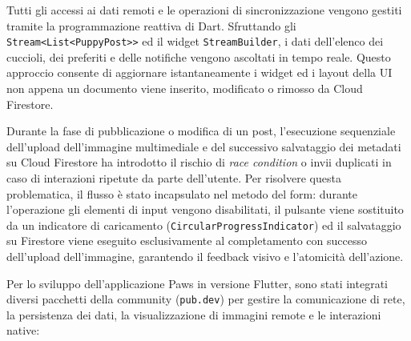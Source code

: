 \documentclass[a4paper]{report}
\begin{document}
Tutti gli accessi ai dati remoti e le operazioni di sincronizzazione vengono gestiti tramite la programmazione reattiva di Dart. Sfruttando gli \texttt{Stream<List<PuppyPost>>} ed il widget \texttt{StreamBuilder}, i dati dell’elenco dei cuccioli, dei preferiti e delle notifiche vengono ascoltati in tempo reale. Questo approccio consente di aggiornare istantaneamente i widget ed i layout della UI non appena un documento viene inserito, modificato o rimosso da Cloud Firestore.


Durante la fase di pubblicazione o modifica di un post, l'esecuzione sequenziale dell'upload dell'immagine multimediale e del successivo salvataggio dei metadati su Cloud Firestore ha introdotto il rischio di \textit{race condition} o invii duplicati in caso di interazioni ripetute da parte dell'utente. Per risolvere questa problematica, il flusso è stato incapsulato nel metodo del form: durante l'operazione gli elementi di input vengono disabilitati, il pulsante viene sostituito da un indicatore di caricamento (\texttt{CircularProgressIndicator}) ed il salvataggio su Firestore viene eseguito esclusivamente al completamento con successo dell'upload dell'immagine, garantendo il feedback visivo e l'atomicità dell'azione.

Per lo sviluppo dell’applicazione Paws in versione Flutter, sono stati integrati diversi pacchetti della community (\texttt{pub.dev}) per gestire la comunicazione di rete, la persistenza dei dati, la visualizzazione di immagini remote e le interazioni native:
\end{document}
